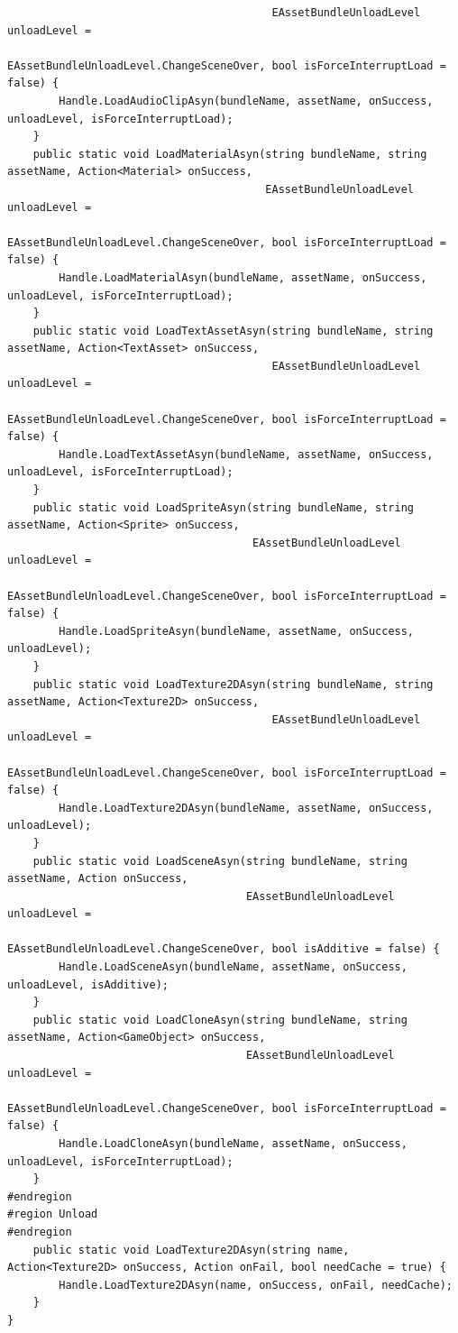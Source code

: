 \documentclass[9pt, b5paper]{article}
\begin{document}
\begin{verbatim}
                                         EAssetBundleUnloadLevel unloadLevel = 
                                         EAssetBundleUnloadLevel.ChangeSceneOver, bool isForceInterruptLoad = false) {
        Handle.LoadAudioClipAsyn(bundleName, assetName, onSuccess, unloadLevel, isForceInterruptLoad);
    }
    public static void LoadMaterialAsyn(string bundleName, string assetName, Action<Material> onSuccess, 
                                        EAssetBundleUnloadLevel unloadLevel = 
                                        EAssetBundleUnloadLevel.ChangeSceneOver, bool isForceInterruptLoad = false) {
        Handle.LoadMaterialAsyn(bundleName, assetName, onSuccess, unloadLevel, isForceInterruptLoad);
    }
    public static void LoadTextAssetAsyn(string bundleName, string assetName, Action<TextAsset> onSuccess, 
                                         EAssetBundleUnloadLevel unloadLevel = 
                                         EAssetBundleUnloadLevel.ChangeSceneOver, bool isForceInterruptLoad = false) {
        Handle.LoadTextAssetAsyn(bundleName, assetName, onSuccess, unloadLevel, isForceInterruptLoad);
    }
    public static void LoadSpriteAsyn(string bundleName, string assetName, Action<Sprite> onSuccess, 
                                      EAssetBundleUnloadLevel unloadLevel = 
                                      EAssetBundleUnloadLevel.ChangeSceneOver, bool isForceInterruptLoad = false) {
        Handle.LoadSpriteAsyn(bundleName, assetName, onSuccess, unloadLevel);
    }
    public static void LoadTexture2DAsyn(string bundleName, string assetName, Action<Texture2D> onSuccess, 
                                         EAssetBundleUnloadLevel unloadLevel = 
                                         EAssetBundleUnloadLevel.ChangeSceneOver, bool isForceInterruptLoad = false) {
        Handle.LoadTexture2DAsyn(bundleName, assetName, onSuccess, unloadLevel);
    }
    public static void LoadSceneAsyn(string bundleName, string assetName, Action onSuccess, 
                                     EAssetBundleUnloadLevel unloadLevel = 
                                     EAssetBundleUnloadLevel.ChangeSceneOver, bool isAdditive = false) {
        Handle.LoadSceneAsyn(bundleName, assetName, onSuccess, unloadLevel, isAdditive);
    }
    public static void LoadCloneAsyn(string bundleName, string assetName, Action<GameObject> onSuccess, 
                                     EAssetBundleUnloadLevel unloadLevel = 
                                     EAssetBundleUnloadLevel.ChangeSceneOver, bool isForceInterruptLoad = false) {
        Handle.LoadCloneAsyn(bundleName, assetName, onSuccess, unloadLevel, isForceInterruptLoad);
    }
#endregion
#region Unload
#endregion
    public static void LoadTexture2DAsyn(string name, Action<Texture2D> onSuccess, Action onFail, bool needCache = true) {
        Handle.LoadTexture2DAsyn(name, onSuccess, onFail, needCache);
    }
}
\end{verbatim}
\end{document}
